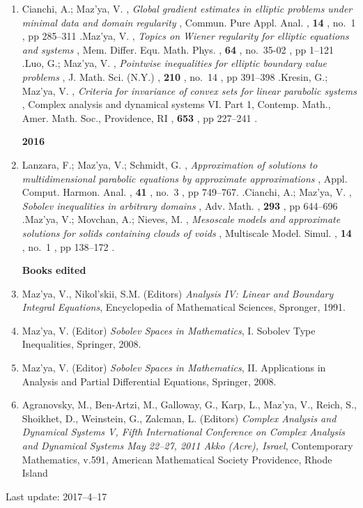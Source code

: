 \documentclass{article}
\newcommand{\authors}[1]{\item #1\ignorespaces}
\renewcommand{\title}[1]{, \textit{#1}\ignorespaces}
\newcommand{\journal}[1]{, {#1}\ignorespaces}
\newcommand{\volume}[1]{, \textbf{#1}\ignorespaces}
\newcommand{\no}[1]{, no.~{#1}\ignorespaces}
\newcommand{\pages}[1]{, pp #1\ignorespaces}
\newcommand{\jitem}[1]{.}
\begin{document}
\begin{enumerate}
\authors{Cianchi, A.; Maz'ya, V.}
\title{Global gradient estimates in elliptic problems under minimal data and domain regularity}
\journal{Commun. Pure Appl. Anal.}
\volume{14}
\no{1}
\pages{285--311}
\jitem

\authors{Maz'ya, V.}
\title{Topics on Wiener regularity for elliptic equations and systems}
\journal{Mem. Differ. Equ. Math. Phys.}
\volume{64}
\no{35-02}
\pages{1--121}
\jitem

\authors{Luo, G.; Maz'ya, V.}
\title{Pointwise inequalities for elliptic boundary value problems}
\journal{ J. Math. Sci. (N.Y.)}
\volume{210}
\no{14}
\pages{391--398}
\jitem

\authors{Kresin, G.; Maz'ya, V.}
\title{Criteria for invariance of convex sets for linear parabolic systems}
\journal{Complex analysis and dynamical systems VI. Part 1, Contemp. Math., Amer. Math. Soc., Providence, RI}
\volume{653}
\pages{227--241}
\jitem

\medskip

{\bf 2016}


\authors{Lanzara, F.; Maz'ya, V.; Schmidt, G.}
\title{Approximation of solutions to multidimensional parabolic equations by
approximate approximations}
\journal{Appl. Comput. Harmon. Anal.}
\volume{41}
\no{3}
\pages{749--767}.
\jitem

\authors{Cianchi, A.; Maz'ya, V.}
\title{Sobolev inequalities in arbitrary domains}
\journal{Adv. Math.}
\volume{293}
\pages{644--696}
\jitem

\authors{Maz'ya, V.; Movchan, A.; Nieves, M.}
\title{Mesoscale models and approximate solutions for solids containing clouds of voids}
\journal{ Multiscale Model. Simul.}
\volume{14}
\no{1}
\pages{138--172}
\jitem

\bigskip

\textbf{\large Books edited}

\item Maz'ya, V., Nikol'skii, S.M. (Editors) {\it Analysis IV: Linear and Boundary Integral Equations}, Encyclopedia of Mathematical Sciences, Spronger, 1991.

\item Maz'ya, V. (Editor)
 {\it Sobolev Spaces in Mathematics},  I. Sobolev Type Inequalities, Springer,  2008.

\item Maz'ya, V. (Editor)
 {\it Sobolev Spaces in Mathematics},  II. Applications in Analysis and Partial Differential Equations, Springer,  2008.


\item  Agranovsky, M.,  Ben-Artzi, M.,  Galloway, G.,
 Karp, L.,  Maz'ya, V.,  Reich, S.,  Shoikhet, D.,
  Weinstein, G.,  Zalcman, L.
(Editors) {\it Complex Analysis and
Dynamical Systems V,
Fifth International Conference on
Complex Analysis and Dynamical Systems
May 22--27, 2011
Akko (Acre), Israel}, Contemporary Mathematics, v.591, American Mathematical Society
Providence, Rhode Island

\end{enumerate}

Last update: 2017--4--17
\end{document}
